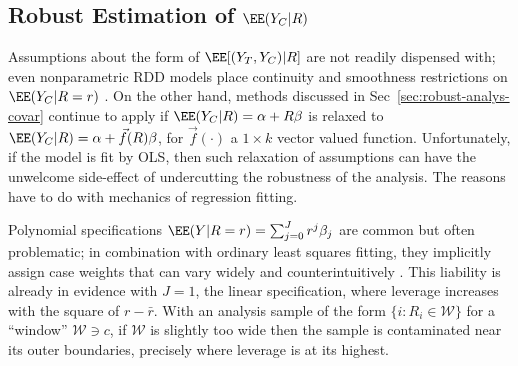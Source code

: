 \subsection{Robust Estimation of $\EE (Y_{C}| R)$}
\label{sec:robust-altern-ordin}

\sloppy
Assumptions about the form of $\EE[(Y_{T}, Y_{C}) | R]$ are not
readily dispensed with;
even nonparametric RDD models
place continuity and smoothness restrictions on $\EE(Y_{C}| R=r)$ \citep[\S~5]{lee2008regression, kolesarRothe17}.
On the other hand, methods discussed in Sec~\ref{sec:robust-analys-covar} continue to
apply if $\EE (Y_{C}| R) = \alpha + R\beta$ is relaxed to
$\EE (Y_{C}| R) = \alpha + \vec{f}(R)\beta$, for
$\vec{f}(\cdot)$ a $1 \times k$ vector valued function.
Unfortunately, if the model is fit by OLS, then such relaxation of assumptions can have the unwelcome
side-effect of undercutting the robustness of the analysis.  The
reasons have to do with mechanics of regression fitting.

Polynomial specifications
$\EE(Y | R=r) = \sum_{j=0}^{J} r^{j} \beta_{j}$ are common but often
problematic; in combination with ordinary least squares fitting, they
implicitly assign case weights that can vary widely and
counterintuitively \citep{gelman2016high}.
This liability is already
in evidence with $J=1$, the linear specification, where leverage
increases with the square of $r -\bar{r}$.  With an analysis sample
of the form $\{i : R_{i} \in \mathcal{W}\}$ for a ``window''
$\mathcal{W} \ni c$, if $\mathcal{W}$ is slightly too wide then the
sample is contaminated near its outer boundaries, precisely
where leverage is at its highest.


